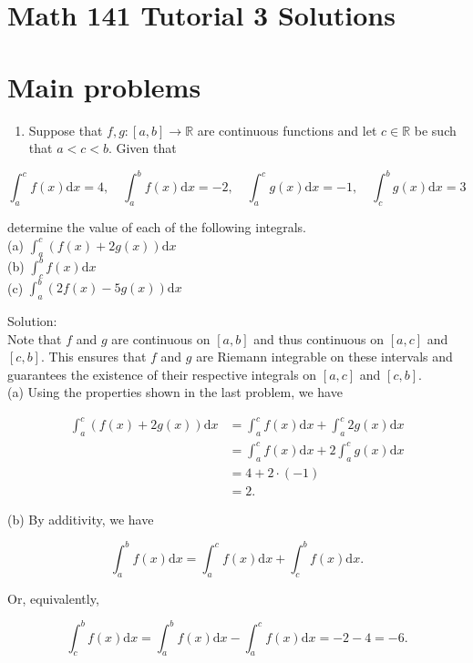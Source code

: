 \documentclass[10pt]{article}
\begin{document}
\section*{Math 141 Tutorial 3 Solutions}
\section*{Main problems}
\begin{enumerate}
  \item Suppose that $f, g:[a, b] \rightarrow \mathbb{R}$ are continuous functions and let $c \in \mathbb{R}$ be such that $a<c<b$. Given that
\end{enumerate}

$$
\int_{a}^{c} f(x) \mathrm{d} x=4, \quad \int_{a}^{b} f(x) \mathrm{d} x=-2, \quad \int_{a}^{c} g(x) \mathrm{d} x=-1, \quad \int_{c}^{b} g(x) \mathrm{d} x=3
$$

determine the value of each of the following integrals.\\
(a) $\int_{a}^{c}(f(x)+2 g(x)) \mathrm{d} x$\\
(b) $\int_{c}^{b} f(x) \mathrm{d} x$\\
(c) $\int_{a}^{b}(2 f(x)-5 g(x)) \mathrm{d} x$

Solution:\\
Note that $f$ and $g$ are continuous on $[a, b]$ and thus continuous on $[a, c]$ and $[c, b]$. This ensures that $f$ and $g$ are Riemann integrable on these intervals and guarantees the existence of their respective integrals on $[a, c]$ and $[c, b]$.\\
(a) Using the properties shown in the last problem, we have

$$
\begin{aligned}
\int_{a}^{c}(f(x)+2 g(x)) \mathrm{d} x & =\int_{a}^{c} f(x) \mathrm{d} x+\int_{a}^{c} 2 g(x) \mathrm{d} x \\
& =\int_{a}^{c} f(x) \mathrm{d} x+2 \int_{a}^{c} g(x) \mathrm{d} x \\
& =4+2 \cdot(-1) \\
& =2 .
\end{aligned}
$$

(b) By additivity, we have

$$
\int_{a}^{b} f(x) \mathrm{d} x=\int_{a}^{c} f(x) \mathrm{d} x+\int_{c}^{b} f(x) \mathrm{d} x .
$$

Or, equivalently,

$$
\int_{c}^{b} f(x) \mathrm{d} x=\int_{a}^{b} f(x) \mathrm{d} x-\int_{a}^{c} f(x) \mathrm{d} x=-2-4=-6 .
$$
\end{document}
